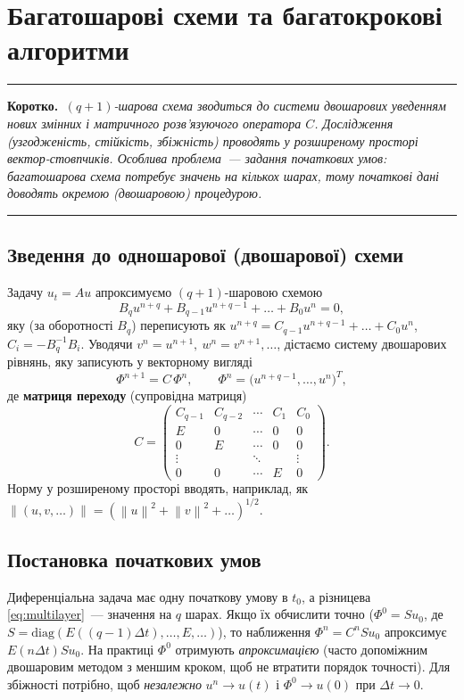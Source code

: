 \documentclass[12pt,a4paper]{article}
\theoremstyle{definition}
\theoremstyle{plain}
\newenvironment{korotko}
  {\par\medskip\noindent\begingroup\color{accent!75!black}\rule{\linewidth}{0.4pt}\par
   \noindent\textbf{Коротко.}\itshape\,}
  {\par\noindent\rule{\linewidth}{0.4pt}\endgroup\medskip}
\newcommand{\norm}[1]{\left\lVert #1 \right\rVert}
\begin{document}
\newpage
\section{Багатошарові схеми та багатокрокові алгоритми}

\begin{korotko}
$(q{+}1)$-шарова схема зводиться до системи двошарових уведенням нових
змінних і \emph{матричного} розв'язуючого оператора $C$. Дослідження
(узгодженість, стійкість, збіжність) проводять у розширеному просторі
вектор-стовпчиків. Особлива проблема~--- задання початкових умов:
багатошарова схема потребує значень на кількох шарах, тому початкові дані
доводять окремою (двошаровою) процедурою.
\end{korotko}

\subsection{Зведення до одношарової (двошарової) схеми}
Задачу $u_t=Au$ апроксимуємо $(q{+}1)$-шаровою схемою
\begin{equation}
  B_q u^{n+q}+B_{q-1}u^{n+q-1}+\dots+B_0 u^n=0,
  \label{eq:multilayer}
\end{equation}
яку (за оборотності $B_q$) переписують як
$u^{n+q}=C_{q-1}u^{n+q-1}+\dots+C_0 u^n$, $C_i=-B_q^{-1}B_i$. Уводячи
$v^n=u^{n+1},\ w^n=v^{n+1},\dots$, дістаємо систему двошарових рівнянь,
яку записують у векторному вигляді
\begin{equation}
  \Phi^{n+1}=C\,\Phi^n,\qquad
  \Phi^n=\big(u^{n+q-1},\dots,u^{n}\big)^{\!T},
\end{equation}
де \textbf{матриця переходу} (супровідна матриця)
\begin{equation}
  C=\begin{pmatrix}
    C_{q-1} & C_{q-2} & \cdots & C_1 & C_0\\
    E & 0 & \cdots & 0 & 0\\
    0 & E & \cdots & 0 & 0\\
    \vdots & & \ddots & & \vdots\\
    0 & 0 & \cdots & E & 0
  \end{pmatrix}.
\end{equation}
Норму у розширеному просторі вводять, наприклад, як
$\norm{(u,v,\dots)}=(\norm{u}^2+\norm{v}^2+\dots)^{1/2}$.

\subsection{Постановка початкових умов}
Диференціальна задача має одну початкову умову в $t_0$, а різницева
\eqref{eq:multilayer}~--- значення на $q$ шарах. Якщо їх обчислити точно
($\Phi^0=S u_0$, де $S=\mathrm{diag}(E((q{-}1)\Delta t),\dots,E,\dots)$),
то наближення $\Phi^n=C^n S u_0$ апроксимує $E(n\Delta t)Su_0$. На
практиці $\Phi^0$ отримують \emph{апроксимацією} (часто допоміжним
двошаровим методом з меншим кроком, щоб не втратити порядок точності).
Для збіжності потрібно, щоб \emph{незалежно} $u^n\to u(t)$ і
$\Phi^0\to u(0)$ при $\Delta t\to0$.
\end{document}
